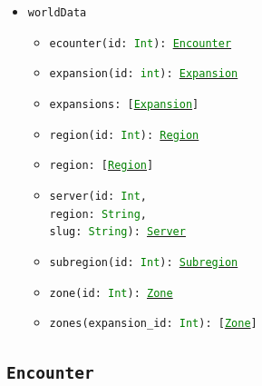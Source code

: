\documentclass[10pt, a4paper]{memoir}
\numberwithin{equation}{section}
\theoremstyle{plain}
\theoremstyle{defp}
\theoremstyle{dotless}
\theoremstyle{definition}
\theoremstyle{dotless}
\theoremstyle{dotless}
\theoremstyle{defp}
\theoremstyle{defp}
\theoremstyle{be}          %
\theoremstyle{defp}
\newcommand\ttt[1]{\texttt{#1}}
\newcommand\type[1]{\ttt{\textcolor{green}{#1}}}
\begin{document}
\begin{itemize}[noitemsep,topsep=1pt]
\item \ttt{worldData}
\begin{itemize}[itemsep=1pt,topsep=1pt]
\item \ttt{ecounter(id: \type{Int}): \hyperref[sec:Encounter]{\type{Encounter}}}
\item \ttt{expansion(id: \type{int}): \hyperref[sec:Expansion]{\type{Expansion}}}
\item \ttt{expansions: [\hyperref[sec:Expansion]{\type{Expansion}}]}
\item \ttt{region(id: \type{Int}): \hyperref[sec:Region]{\type{Region}}}
\item \ttt{region: [\hyperref[sec:Region]{\type{Region}}]}
\item \ttt{server(id: \type{Int},\\region: \type{String},\\slug: \type{String}): \hyperref[sec:Server]{\type{Server}}}
\item \ttt{subregion(id: \type{Int}): \hyperref[sec:Subregion]{\type{Subregion}}}
\item \ttt{zone(id: \type{Int}): \hyperref[sec:Zone]{\type{Zone}}}
\item \ttt{zones(expansion\_id: \type{Int}): [\hyperref[sec:Zone]{\type{Zone}}]}
\end{itemize}
\end{itemize}

\subsection{\ttt{Encounter}}\label{sec:Encounter}
\end{document}
